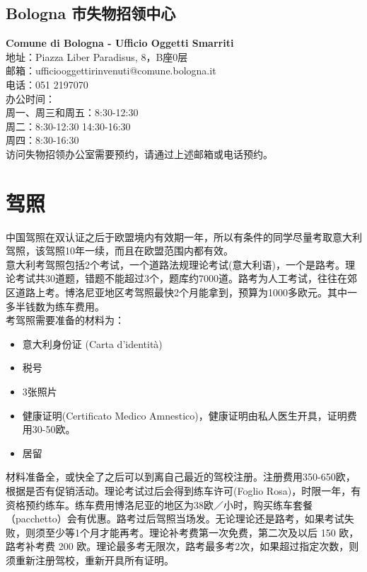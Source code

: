\subsection{Bologna 市失物招领中心}
\textbf{Comune di Bologna - Ufficio Oggetti Smarriti}\\
地址：Piazza Liber Paradisus, 8，B座0层\\
邮箱：ufficiooggettirinvenuti@comune.bologna.it\\
电话：051 2197070 \\
办公时间：\\
周一、周三和周五：8:30-12:30\\
周二：8:30-12:30 14:30-16:30\\
周四：8:30-16:30\\
访问失物招领办公室需要预约，请通过上述邮箱或电话预约。\\



\section{驾照}

中国驾照在双认证之后于欧盟境内有效期一年，所以有条件的同学尽量考取意大利驾照，该驾照10年一续，而且在欧盟范围内都有效。\\
意大利考驾照包括2个考试，一个道路法规理论考试(意大利语)，一个是路考。理论考试共30道题，错题不能超过3个，题库约7000道。路考为人工考试，往往在郊区道路上考。博洛尼亚地区考驾照最快2个月能拿到，预算为1000多欧元。其中一多半钱数为练车费用。\\
考驾照需要准备的材料为：
\begin{itemize}
\item 意大利身份证 (Carta d'identità)
\item 税号
\item 3张照片
\item 健康证明(Certificato Medico Amnestico)，健康证明由私人医生开具，证明费用30-50欧。
\item 居留
\end{itemize}
材料准备全，或快全了之后可以到离自己最近的驾校注册。注册费用350-650欧，根据是否有促销活动。理论考试过后会得到练车许可(Foglio Rosa)，时限一年，有资格预约练车。练车费用博洛尼亚的地区为38欧／小时，购买练车套餐（pacchetto）会有优惠。路考过后驾照当场发。无论理论还是路考，如果考试失败，则须至少等1个月才能再考。理论补考费第一次免费，第二次及以后 150 欧，路考补考费 200 欧。理论最多考无限次，路考最多考2次，如果超过指定次数，则须重新注册驾校，重新开具所有证明。


